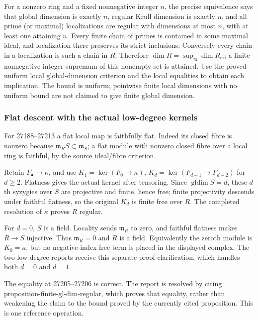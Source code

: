 For a nonzero ring and a fixed nonnegative integer \(n\), the precise equivalence says that global dimension is exactly \(n\), regular Krull dimension is exactly \(n\), and all prime (or maximal) localizations are regular with dimensions at most \(n\), with at least one attaining \(n\). Every finite chain of primes is contained in some maximal ideal, and localization there preserves its strict inclusions. Conversely every chain in a localization is such a chain in \(R\). Therefore \(\dim R=\sup_{\mathfrak m}\dim R_{\mathfrak m}\); a finite nonnegative integer supremum of this nonempty set is attained. Use the proved uniform local global-dimension criterion and the local equalities to obtain each implication. The bound is uniform; pointwise finite local dimensions with no uniform bound are not claimed to give finite global dimension.

\subsubsection{Flat descent with the actual low-degree kernels}\label{algebra-proof-023-flat-descent-with-the-actual-low-degree-kernels}

For 27188--27213 a flat local map is faithfully flat. Indeed its closed fibre is nonzero because \(\mathfrak m_RS\subset\mathfrak m_S\); a flat module with nonzero closed fibre over a local ring is faithful, by the source ideal/fibre criterion.

Retain \(F_\bullet\to\kappa\), and use \(K_1=\ker(F_0\to\kappa)\), \(K_d=\ker(F_{d-1}\to F_{d-2})\) for \(d\ge2\). Flatness gives the actual kernel after tensoring. Since \(\operatorname{gldim}S=d\), these \(d\)th syzygies over \(S\) are projective and finite, hence free; finite projectivity descends under faithful flatness, so the original \(K_d\) is finite free over \(R\). The completed resolution of \(\kappa\) proves \(R\) regular.

For \(d=0\), \(S\) is a field. Locality sends \(\mathfrak m_R\) to zero, and faithful flatness makes \(R\to S\) injective. Thus \(\mathfrak m_R=0\) and \(R\) is a field. Equivalently the zeroth module is \(K_0=\kappa\), but no negative-index free term is placed in the displayed complex. The two low-degree reports receive this separate proof clarification, which handles both \(d=0\) and \(d=1\).

The equality at 27205--27206 is correct. The report is resolved by citing proposition-\AlgebraIdentifierBreak{}finite-\AlgebraIdentifierBreak{}gl-\AlgebraIdentifierBreak{}dim-\AlgebraIdentifierBreak{}regular, which proves that equality, rather than weakening the claim to the bound proved by the currently cited proposition. This is one reference operation.

